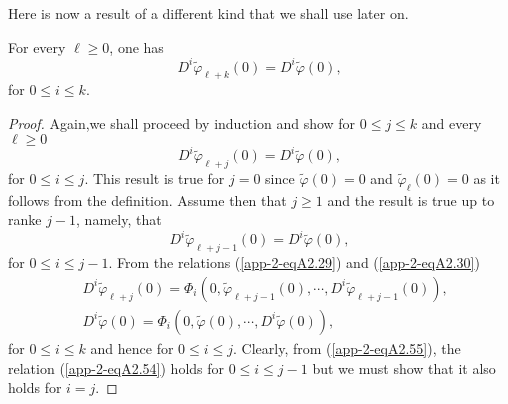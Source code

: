 Here is now a result of a different kind that we shall use later on.

\begin{alphlemma}\label{app-2-lemA2.7}%
For every $\ell \geq 0$, one has
\begin{equation*}
D^{i} \widetilde{\varphi}_{\ell + k} (0) =
D^{i}\widetilde{\varphi}(0),\tag{A2.53} \label{app-2-eqA2.53}
\end{equation*}
for $0 \leq i \leq k$.
\end{alphlemma}

\begin{proof}
Again,\pageoriginale we shall proceed by induction and show for $0
\leq j \leq k$ and every $\ell \geq 0$
\begin{equation*}
D^{i}\widetilde{\varphi}_{\ell + j} (0) = D^{i}\widetilde{\varphi}(0),\tag{A2.54}\label{app-2-eqA2.54}
\end{equation*}
for $0 \leq i \leq j$. This result is true for $j = 0$ since
$\widetilde{\varphi}(0) = 0$ and $\widetilde{\varphi}_{\ell}(0) = 0$
as it follows from the definition. Assume then that $j \geq 1$ and the
result is true up to ranke $j - 1$, namely, that
\begin{equation*}
D^{i}\widetilde{\varphi}_{\ell + j-1} (0) =
D^{i}\widetilde{\varphi}(0),\tag{A2.55} \label{app-2-eqA2.55}
\end{equation*}
for $0 \leq i \leq j-1$. From the relations (\ref{app-2-eqA2.29}) and (\ref{app-2-eqA2.30})
\begin{align*}
& D^{i}\widetilde{\varphi}_{\ell + j}(0) = \Phi_{i} (0,
\widetilde{\varphi}_{\ell + j-1} (0), \cdots,
D^{i}\widetilde{\varphi}_{\ell + j - 1}(0)),\tag{A2.56}\label{app-2-eqA2.56}\\
& D^{i}\widetilde{\varphi}(0) = \Phi_{i} (0, \widetilde{\varphi}(0),
\cdots , D^{i}\widetilde{\varphi}(0)),\tag{A2.57}\label{app-2-eqA2.57}
\end{align*}
for $0 \leq i \leq k$ and hence for $0 \leq i \leq j$. Clearly, from
(\ref{app-2-eqA2.55}), the relation (\ref{app-2-eqA2.54}) holds for $0 \leq i \leq j-1$ but we must show that it also holds for $i = j$.


\end{proof}
